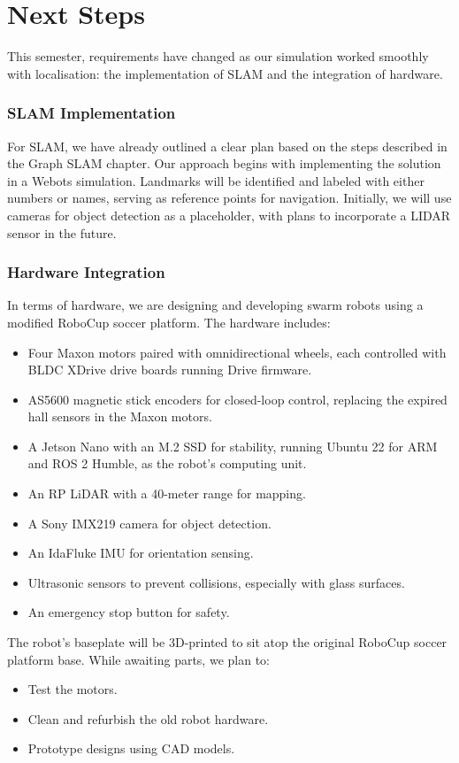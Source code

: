 \chapter{Next Steps}

This semester, requirements have changed as our simulation worked smoothly with localisation: the implementation of SLAM and the integration of hardware.

\subsection*{SLAM Implementation}
For SLAM, we have already outlined a clear plan based on the steps described in the Graph SLAM chapter. Our approach begins with implementing the solution in a Webots simulation. Landmarks will be identified and labeled with either numbers or names, serving as reference points for navigation. Initially, we will use cameras for object detection as a placeholder, with plans to incorporate a LIDAR sensor in the future.

\subsection*{Hardware Integration}
In terms of hardware, we are designing and developing swarm robots using a modified RoboCup soccer platform. The hardware includes:
\begin{itemize}
    \item Four Maxon motors paired with omnidirectional wheels, each controlled with BLDC XDrive drive boards running Drive firmware.
    \item AS5600 magnetic stick encoders for closed-loop control, replacing the expired hall sensors in the Maxon motors.
    \item A Jetson Nano with an M.2 SSD for stability, running Ubuntu 22 for ARM and ROS 2 Humble, as the robot’s computing unit.
    \item An RP LiDAR with a 40-meter range for mapping.
    \item A Sony IMX219 camera for object detection.
    \item An IdaFluke IMU for orientation sensing.
    \item Ultrasonic sensors to prevent collisions, especially with glass surfaces.
    \item An emergency stop button for safety.
\end{itemize}

The robot’s baseplate will be 3D-printed to sit atop the original RoboCup soccer platform base. While awaiting parts, we plan to:
\begin{itemize}
    \item Test the motors.
    \item Clean and refurbish the old robot hardware.
    \item Prototype designs using CAD models.
\end{itemize}

